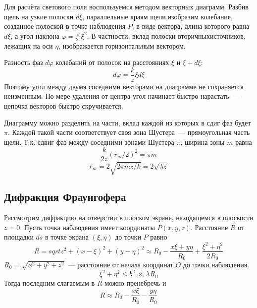 Для расчёта светового поля воспользуемся методом векторных диаграмм. Разбив щель на узкие полоски $d\xi$, параллельные краям щели,изобразим колебание, созданное полоской в точке наблюдения $P$, в виде вектора, длина которого равна $d\xi$, а угол наклона $ \varphi = \frac{k}{2z}\xi^{2}$. В частности, вклад полоски вторичныхисточников, лежащих на оси $\eta$, изображается горизонтальным вектором.

Разность фаз $d\varphi$  колебаний от полосок на расстояниях $\xi$ и $\xi + d\xi$:
\[
    d\varphi = \frac{k}{z}\xi d\xi
\]
Поэтому угол между двумя соседними векторами на диаграмме не сохраняется неизменным. По мере удаления от центра угол начинает быстро нарастать~--- цепочка векторов быстро скручивается.

\begin{figure}[ht!]
\end{figure}

Диаграмму можно разделить на части, вклад каждой из которых в сдиг фаз будет $\pi$. Каждой такой части соответствует своя зона Шустера~--- прямоугольная часть щели. Т.к. сдвиг фаз между соседними зонами Шустера $\pi$, ширина зоны $m$ равна
\[
    \frac{k}{2z}\left(r_{m} / 2\right)^{2} = \pi m
\]
\[
    r_{m} = 2 \sqrt{2\pi m z / k} = 2 \sqrt{ \lambda z}
\]

\subsection{Дифракция Фраунгофера}
Рассмотрим дифракцию на отверстии в плоском экране, находящемся в плоскости $z = 0$. Пусть точка наблюдения имеет координаты $P(x, y, z)$. Расстояние $R$  от площадки $ds$ в точке экрана $(\xi, \eta)$ до точки $P$ равно
\[
    R = sqrt{z^{2} + \left(x - \xi\right)^{2} + \left(y - \eta\right)^{2}}\approx R_{0} - \frac{x\xi + y\eta}{R_{0}} + \frac{\xi^{2} + \eta^{2}}{2R_{0}}
\]
$R_{0} = \sqrt{x^{2} + y^{2} + z^{2}}$~--- расстояние от начала координат $O$ до точки наблюдения.
\[
    \xi^{2} + \eta^{2} \le b^{2} \ll \lambda R_{0}
\]
Тогда последним слагаемым в $R$ можно пренебречь и
\[
    R\approx R_{0} -\frac{x\xi}{R_{0}} - \frac{y\eta}{R_{0}}
\]

